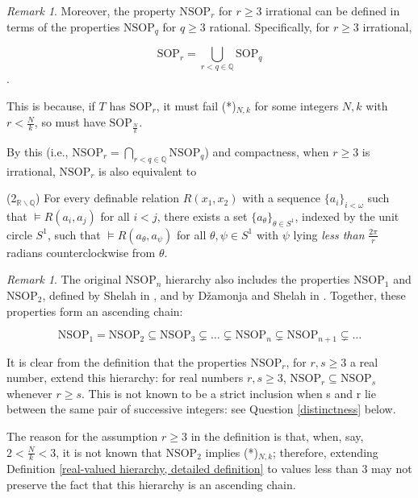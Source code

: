 \documentclass{amsart}
\theoremstyle{definition}
\theoremstyle{remark}
\newtheorem{remark}[theorem]{Remark}
\numberwithin{equation}{section}
\begin{document}
\begin{remark}
Moreover, the property $\mathrm{NSOP}_{r}$ for $r \geq 3$ irrational can be defined in terms of the properties $\mathrm{NSOP}_{q}$ for $q \geq 3$ rational. Specifically, for $r \geq 3$ irrational,

$$\mathrm{SOP}_{r} = \bigcup_{r < q \in \mathbb{Q}}\mathrm{SOP}_{q}$$.

This is because, if $T$ has $\mathrm{SOP}_{r}$, it must fail (*)$_{N, k}$ for some integers $N, k$ with $r < \frac{N}{k}$, so must have $\mathrm{SOP}_{\frac{N}{k}}$.

By this (i.e., $\mathrm{NSOP}_{r} = \bigcap_{r < q \in \mathbb{Q}}\mathrm{NSOP}_{q}$) and compactness, when $r \geq 3$ is irrational, $\mathrm{NSOP}_{r}$ is also equivalent to

(2$_{\mathbb{R} \backslash \mathbb{Q}}$) For every definable relation $R(x_{1}, x_{2})$ with a sequence $\{a_{i}\}_{i < \omega}$ such that $\models R(a_{i}, a_{j})$ for all $i < j$, there exists a set $\{a_{\theta}\}_{\theta \in S^{1}}$, indexed by the unit circle $S^{1}$, such that $\models R(a_{\theta}, a_{\psi})$ for all $\theta, \psi \in S^{1}$ with $\psi$ lying \textit{less than} $\frac{2\pi}{r}$ radians counterclockwise from $\theta$.

\end{remark}

\begin{remark}\label{ascending chain}
    The original $\mathrm{NSOP}_{n}$ hierarchy also includes the properties $\mathrm{NSOP}_{1}$ and $\mathrm{NSOP}_{2}$, defined by Shelah in \cite{Sh90}, \cite{Sh99} and by Džamonja and Shelah in \cite{DS04}. Together, these properties form an ascending chain:

    $$\mathrm{NSOP}_{1} = \mathrm{NSOP}_{2} \subseteq \mathrm{NSOP}_{3} \subsetneq \ldots \subsetneq \mathrm{NSOP}_{n} \subsetneq \mathrm{NSOP}_{n+1} \subsetneq \ldots$$

    It is clear from the definition that the properties $\mathrm{NSOP}_{r}$, for $r, s \geq 3$ a real number, extend this hierarchy: for real numbers $r, s \geq 3$, $\mathrm{NSOP}_{r} \subseteq \mathrm{NSOP}_{s}$ whenever $r \geq s$. This is not known to be a strict inclusion when s and r lie between the same pair of successive integers: see Question \ref{distinctness} below.

    The reason for the assumption $r \geq 3$ in the definition is that, when, say, $2 < \frac{N}{k} < 3$, it is not known that $\mathrm{NSOP}_{2}$ implies (*)$_{N, k}$; therefore, extending Definition \ref{real-valued hierarchy, detailed definition} to values less than $3$ may not preserve the fact that this hierarchy is an ascending chain.

    
\end{remark}
\end{document}

